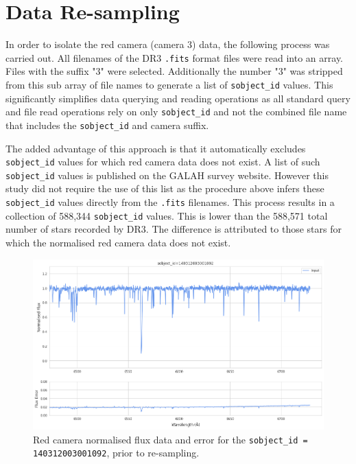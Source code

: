 \section{Data Re-sampling}

In order to isolate the red camera (camera 3) data, the following process was carried out. All filenames of the DR3 \texttt{.fits} format files were read into an array. Files with the suffix "3" were selected. Additionally the number "3" was stripped from this sub array of file names to generate a list of \texttt{sobject\_id} values. This significantly simplifies data querying and reading operations as all standard query and file read operations rely on only \texttt{sobject\_id} and not the combined file name that includes the \texttt{sobject\_id} and camera suffix. 

The added advantage of this approach is that it automatically excludes \texttt{sobject\_id} values for which red camera data does not exist. A list of such \texttt{sobject\_id} values is published on the GALAH survey website. However this study did not require the use of this list as the procedure above infers these \texttt{sobject\_id} values directly from the \texttt{.fits} filenames. This process results in a collection of 588,344 \texttt{sobject\_id} values. This is lower than the 588,571 total number of stars recorded by DR3. The difference is attributed to those stars for which the normalised red camera data does not exist. 

\begin{figure}[!htb]
\centering
\includegraphics[scale=.40]{figures/input spectrum.png}
\caption{Red camera normalised flux data and error for the \texttt{sobject\_id = 140312003001092}, prior to re-sampling.}
\end{figure}

